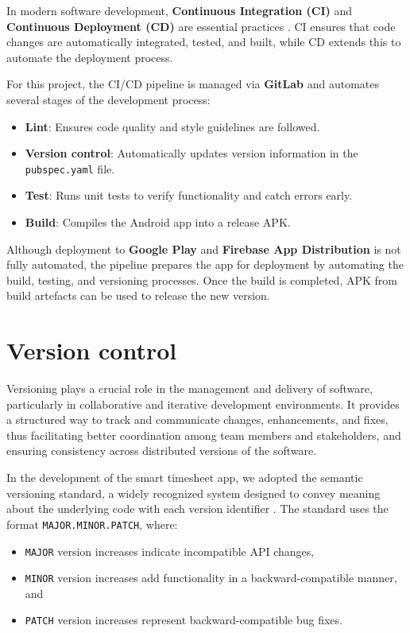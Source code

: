 \documentclass[
  digital,     %
  oneside,     %
  nosansbold,  %
  nocolorbold, %
  lof,         %
  lot,         %
]{fithesis4}
\begin{document}
In modern software development, \textbf{Continuous Integration (\gls{CI})} and \textbf{Continuous Deployment (\gls{CD})} are essential practices \cite{gitlabCI}. \gls{CI} ensures that code changes are automatically integrated, tested, and built, while \gls{CD} extends this to automate the deployment process.

For this project, the \gls{CI}/\gls{CD} pipeline is managed via \textbf{GitLab} and automates several stages of the development process:

\begin{itemize}
  \item \textbf{Lint}: Ensures code quality and style guidelines are followed.
  \item \textbf{Version control}: Automatically updates version information in the \texttt{pubspec.yaml} file.
  \item \textbf{Test}: Runs unit tests to verify functionality and catch errors early.
  \item \textbf{Build}: Compiles the Android app into a release \gls{APK}.
\end{itemize}

Although deployment to \textbf{Google Play} and \textbf{Firebase App Distribution} is not fully automated, the pipeline prepares the app for deployment by automating the build, testing, and versioning processes. Once the build is completed, \gls{APK} from build artefacts can be used to release the new version.

\section{Version control}

Versioning plays a crucial role in the management and delivery of software, particularly in collaborative and iterative development environments. It provides a structured way to track and communicate changes, enhancements, and fixes, thus facilitating better coordination among team members and stakeholders, and ensuring consistency across distributed versions of the software.

In the development of the smart timesheet app, we adopted the semantic versioning standard, a widely recognized system designed to convey meaning about the underlying code with each version identifier \cite{semver}. The standard uses the format \texttt{MAJOR.MINOR.PATCH}, where:

\begin{itemize}
  \item \texttt{MAJOR} version increases indicate incompatible \gls{API} changes,
  \item \texttt{MINOR} version increases add functionality in a backward-compatible manner, and
  \item \texttt{PATCH} version increases represent backward-compatible bug fixes.
\end{itemize}
\end{document}
